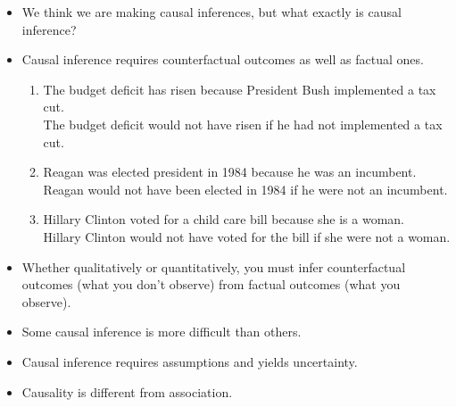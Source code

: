 \documentclass[20pt,landscape,pdftex]{foils}
\begin{document}


\hypersetup{pdfpagetransition=Replace}

\begin{itemize}
\item We think we are making causal inferences, but what exactly is
  causal inference?\pause
  
\item Causal inference requires counterfactual outcomes as well as
  factual ones.\pause
  \begin{enumerate}
  \item The budget deficit has risen because President Bush
    implemented a tax cut.\pause\\
    The budget deficit would not have risen if he had not
    implemented a tax cut.\pause\\

  \item Reagan was elected president in 1984 because he was an incumbent.\pause\\
    Reagan would not have been elected in 1984 if he were not an
    incumbent.\pause\\ 
    
  \item Hillary Clinton voted for a child care bill because she is a woman.\pause\\
    Hillary Clinton would not have voted for the bill if she were not
    a woman.\pause
  \end{enumerate}  
  
\item Whether qualitatively or quantitatively, you must infer
  counterfactual outcomes (what you don't observe) from factual
  outcomes (what you observe).\pause

\item Some causal inference is more difficult than others.\pause
      
\item Causal inference requires assumptions and yields uncertainty.\pause

\item Causality is different from association.\pause

\end{itemize}


\end{document}
